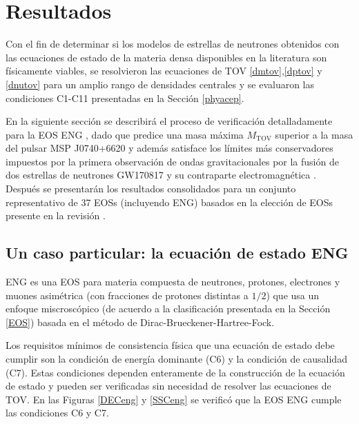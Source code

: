 \chapter{Resultados}

Con el fin de determinar si los modelos de estrellas de neutrones obtenidos con las ecuaciones de estado de la materia densa disponibles en la literatura son físicamente viables, se resolvieron las ecuaciones de TOV \eqref{dmtov},\eqref{dptov} y \eqref{dnutov} para un amplio rango de densidades centrales y se evaluaron las condiciones C1-C11 presentadas en la Sección \ref{phyacep}.

En la siguiente sección se describirá el proceso de verificación detalladamente para la EOS ENG \cite{Engvik1994}, dado que predice una masa máxima $M_{\text{TOV}}$ superior a la masa del pulsar MSP J0740+6620 \cite{Cromartie2019} y además satisface los límites más conservadores impuestos por la primera observación de ondas gravitacionales por la fusión de dos estrellas de neutrones GW170817 y su contraparte electromagnética \cite{Rezzolla2017,Radice2018,Ruiz2018,Shibata2019}. Después se presentarán los resultados consolidados para un conjunto representativo de 37 EOSs (incluyendo ENG) basados en la elección de EOSs presente en la revisión \cite{Ozel2016}.

\section{Un caso particular: la ecuación de estado ENG}

ENG es una EOS para materia compuesta de neutrones, protones, electrones y muones asimétrica (con fracciones de protones distintas a $1/2$) que usa un enfoque miscroscópico (de acuerdo a la clasificación presentada en la Sección \ref{EOS}) basada en el método de Dirac-Brueckener-Hartree-Fock. 

Los requisitos mínimos de consistencia física que una ecuación de estado debe cumplir son la condición de energía dominante (C6) y la condición de causalidad (C7). Estas condiciones dependen enteramente de la construcción de la ecuación de estado y pueden ser verificadas sin necesidad de resolver las ecuaciones de TOV. En las Figuras \ref{DECeng} y \ref{SSCeng} se verificó que la EOS ENG cumple las condiciones C6 y C7.

